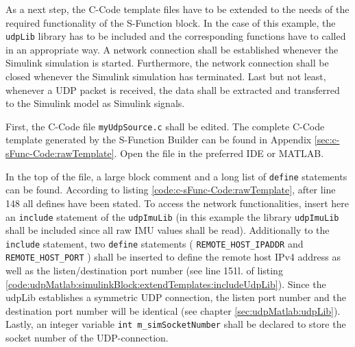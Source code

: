 As a next step, the C-Code template files have to be extended to the needs of the required functionality of the S-Function block. In the case of this example, the \texttt{udpLib} library has to be included and the corresponding functions have to called in an appropriate way. A network connection shall be established whenever the Simulink simulation is started. Furthermore, the network connection shall be closed whenever the Simulink simulation has terminated. Last but not least, whenever a UDP packet is received, the data shall be extracted and transferred to the Simulink model as Simulink signals.

First, the C-Code file \texttt{myUdpSource.c} shall be edited. The complete C-Code template generated by the S-Function Builder can be found in Appendix \ref{sec:c-sFunc-Code:rawTemplate}. Open the file in the preferred IDE or MATLAB.

In the top of the file, a large block comment and a long list of \texttt{define} statements can be found. According to listing \ref{code:c-sFunc-Code:rawTemplate}, after line 148 all defines have been stated. To access the network functionalities, insert here an \texttt{include} statement of the \texttt{udpImuLib} (in this example the library \texttt{udpImuLib} shall be included since all raw IMU values shall be read). Additionally to the \texttt{include} statement, two \texttt{define} statements ( \texttt{REMOTE\_HOST\_IPADDR} and \texttt{REMOTE\_HOST\_PORT} ) shall be inserted to define the remote host IPv4 address as well as the listen/destination port number (see line 151l. of listing \ref{code:udpMatlab:simulinkBlock:extendTemplates:includeUdpLib}). Since the udpLib establishes a symmetric UDP connection, the listen port number and the destination port number will be identical (see chapter \ref{sec:udpMatlab:udpLib}). Lastly, an integer variable \texttt{int m\_simSocketNumber} shall be declared to store the socket number of the UDP-connection.

